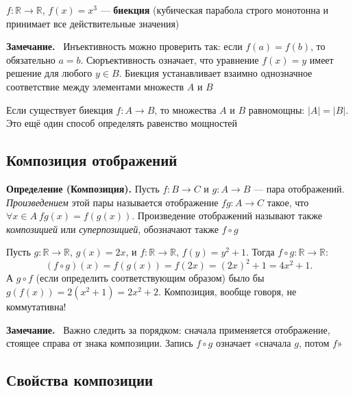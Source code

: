 \documentclass[a4paper,12pt]{article}
\newcommand{\myremark}{\textbf{Замечание.}\ }
\theoremstyle{definition}
\theoremstyle{plain}
\theoremstyle{remark}
\begin{document}
	\begin{tcolorbox}[colback=gray!5, colframe=gray!50, title=Биекция]
		$f \colon \mathbb{R} \to \mathbb{R}$, $f(x) = x^3$ — \textbf{биекция} (кубическая парабола строго монотонна и принимает все действительные значения)
	\end{tcolorbox}
	
	\myremark
	Инъективность можно проверить так: если $f(a) = f(b)$, то обязательно $a = b$. Сюръективность означает, что уравнение $f(x) = y$ имеет решение для любого $y \in B$. Биекция устанавливает взаимно однозначное соответствие между элементами множеств $A$ и $B$
	
	\begin{tcolorbox}[colback=purple!5, colframe=purple!50!black, title=Связь с мощностями]
		Если существует биекция $f \colon A \to B$, то множества $A$ и $B$ равномощны: $|A| = |B|$. Это ещё один способ определять равенство мощностей
	\end{tcolorbox}
	
	\subsection{Композиция отображений}
	
	\noindent \textbf{Определение (Композиция).}
	Пусть $f \colon B \to C$ и $g \colon A \to B$ — пара отображений. \textit{Произведением} этой пары называется отображение $fg \colon A \to C$ такое, что $\forall x \in A \ fg(x) = f(g(x))$. Произведение отображений называют также \textit{композицией} или \textit{суперпозицией}, обозначают также $f \circ g$
	
	\begin{tcolorbox}[colback=blue!5, colframe=blue!40!black, title=Пример композиции]
		Пусть $g \colon \mathbb{R} \to \mathbb{R}$, $g(x) = 2x$, и $f \colon \mathbb{R} \to \mathbb{R}$, $f(y) = y^2 + 1$.
		Тогда $f \circ g \colon \mathbb{R} \to \mathbb{R}$:
		\[
		(f \circ g)(x) = f(g(x)) = f(2x) = (2x)^2 + 1 = 4x^2 + 1.
		\]
		А $g \circ f$ (если определить соответствующим образом) было бы $g(f(x)) = 2(x^2 + 1) = 2x^2 + 2$. Композиция, вообще говоря, не коммутативна!
	\end{tcolorbox}
	
	\myremark
	Важно следить за порядком: сначала применяется отображение, стоящее справа от знака композиции. Запись $f \circ g$ означает «сначала $g$, потом $f$»
	
	\subsection{Свойства композиции}
	
\end{document}

